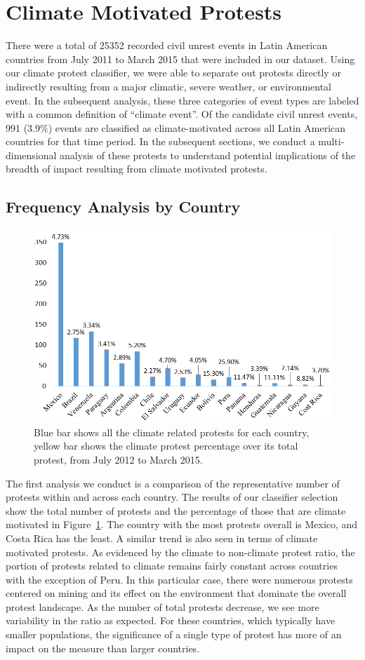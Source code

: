 \documentclass[9pt,twocolumn,twoside]{pnas-new}
\begin{document}
\section{Climate Motivated Protests}
There were a total of 25352 recorded civil unrest events in Latin American countries from July 2011 to March 2015 that were included in our dataset.
Using our climate protest classifier, we were able to separate out protests directly or indirectly resulting from a major climatic, severe weather, or environmental event.
In the subsequent analysis, these three categories of event types are labeled with a common definition of ``climate event''.
Of the candidate civil unrest events, 991 (3.9\%) events are classified as climate-motivated across all Latin American countries for that time period.
In the subsequent sections, we conduct a multi-dimensional analysis of these protests to understand potential implications of the breadth of impact resulting from climate motivated protests.

\subsection{Frequency Analysis by Country}

\begin{figure}[htb]
\centerline
{\includegraphics[width=.48\textwidth]{figures/month-country-protest4}}
\caption{Blue bar shows all the climate related protests for each country, yellow bar shows the climate protest percentage over its total protest, from July 2012 to March 2015.}
\label{month_percentage}
\end{figure}

The first analysis we conduct is a comparison of the representative number of protests within and across each country.
The results of our classifier selection show the total number of protests and the percentage of those that are climate motivated in Figure~\ref{month_percentage}.
The country with the most protests overall is Mexico, and Costa Rica has the least.
A similar trend is also seen in terms of climate motivated protests.
As evidenced by the climate to non-climate protest ratio, the portion of protests related to climate remains fairly constant across countries with the exception of Peru.
In this particular case, there were numerous protests centered on mining and its effect on the environment that dominate the overall protest landscape.
As the number of total protests decrease, we see more variability in the ratio as expected.
For these countries, which typically have smaller populations, the significance of a single type of protest has more of an impact on the measure than larger countries.
\end{document}
